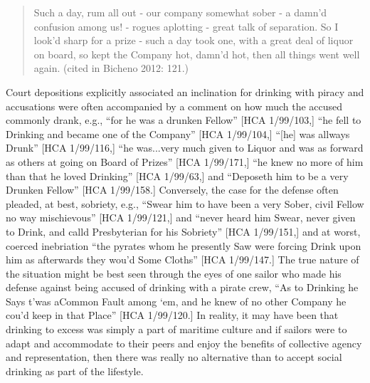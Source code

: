 \documentclass[12pt]{article}
\newenvironment{styleStandard}{\renewcommand\baselinestretch{1.0}\setlength\leftskip{0cm}\setlength\rightskip{0cm plus 1fil}\setlength\parindent{0cm}\setlength\parfillskip{0pt plus 1fil}\setlength\parskip{0in plus 1pt}\writerlistparindent\writerlistleftskip\leavevmode\normalfont\normalsize\writerlistlabel\ignorespaces}{\unskip\vspace{0in plus 1pt}\par}
\newcommand\writerlistleftskip{}
\newcommand\writerlistparindent{}
\newcommand\writerlistlabel{}
\begin{document}
\begin{quotation}
Such a day, rum all out - our company somewhat sober - a damn’d confusion among us! - rogues aplotting - great talk of separation. So I look’d sharp for a prize - such a day took one, with a great deal of liquor on board, so kept the Company hot, damn’d hot, then all things went well again. (cited in Bicheno 2012: 121.) 

\end{quotation}
\begin{styleStandard}
Court depositions explicitly associated an inclination for drinking with piracy and accusations were often accompanied by a comment on how much the accused commonly drank, e.g., “for he was a drunken Fellow” [HCA 1/99/103,] “he fell to Drinking and became one of the Company” [HCA 1/99/104,] “[he] was allways Drunk” [HCA 1/99/116,] “he was...very much given to Liquor and was as forward as others at going on Board of Prizes” [HCA 1/99/171,] “he knew no more of him than that he loved Drinking” [HCA 1/99/63,] and “Deposeth him to be a very Drunken Fellow” [HCA 1/99/158.] Conversely, the case for the defense often pleaded, at best, sobriety, e.g., “Swear him to have been a very Sober, civil Fellow no way mischievous” [HCA 1/99/121,] and “never heard him Swear, never given to Drink, and calld Presbyterian for his Sobriety” [HCA 1/99/151,] and at worst, coerced inebriation “the pyrates whom he presently Saw were forcing Drink upon him as afterwards they wou’d Some Cloths” [HCA 1/99/147.] The true nature of the situation might be best seen through the eyes of one sailor who made his defense against being accused of drinking with a pirate crew, “As to Drinking he Says t’was aCommon Fault among ‘em, and he knew of no other Company he cou’d keep in that Place” [HCA 1/99/120.] In reality, it may have been that drinking to excess was simply a part of maritime culture and if sailors were to adapt and accommodate to their peers and enjoy the benefits of collective agency and representation, then there was really no alternative than to accept social drinking as part of the lifestyle. \ 
\end{styleStandard}
\end{document}
